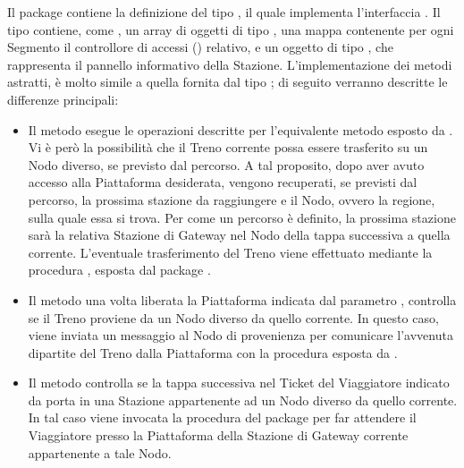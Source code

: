 	Il package  contiene la definizione del tipo  , il quale implementa l'interfaccia . Il tipo  contiene, come , un array di oggetti di tipo , una mappa  contenente per ogni Segmento il controllore di accessi () relativo, e un oggetto di tipo , che rappresenta il pannello informativo della Stazione.
	L'implementazione dei metodi astratti, è molto simile a quella fornita dal tipo ; di seguito verranno descritte le differenze principali:
	\begin{itemize}
		
		\item Il metodo  esegue le operazioni descritte per l'equivalente metodo esposto da . Vi è però la possibilità che il Treno corrente possa essere trasferito su un Nodo diverso, se previsto dal percorso. A tal proposito, dopo aver avuto accesso alla Piattaforma desiderata, vengono recuperati, se previsti dal percorso, la prossima stazione da raggiungere e il Nodo, ovvero la regione, sulla quale essa si trova. Per come un percorso è definito, la prossima stazione sarà la relativa Stazione di Gateway nel Nodo della tappa successiva a quella corrente. L'eventuale trasferimento del Treno viene effettuato mediante la procedura , esposta dal package .
		
		\item Il metodo  una volta liberata la Piattaforma indicata dal parametro , controlla se il Treno proviene da un Nodo diverso da quello corrente. In questo caso, viene inviata un messaggio al Nodo di provenienza per comunicare l'avvenuta dipartite del Treno dalla Piattaforma con la procedura  esposta da .
		
		\item Il metodo  controlla se la tappa successiva nel Ticket del Viaggiatore indicato da  porta in una Stazione appartenente ad un Nodo diverso da quello corrente. In tal caso viene invocata la procedura  del package  per far attendere il Viaggiatore presso la Piattaforma della Stazione di Gateway corrente appartenente a tale Nodo.
		
	\end{itemize}
	
	
	
